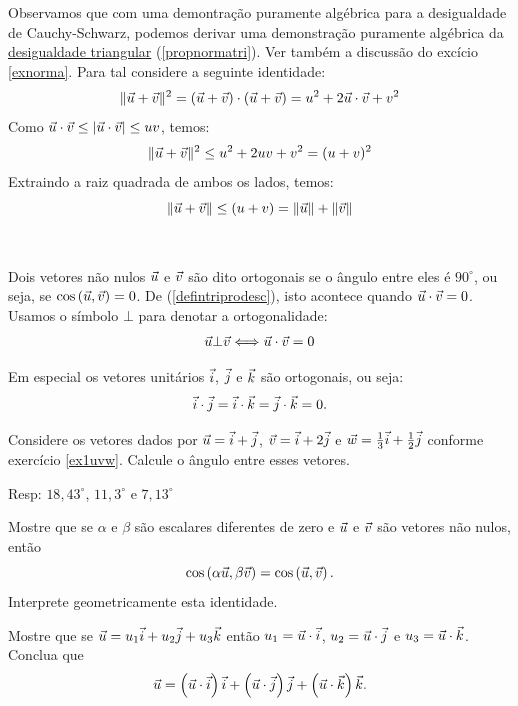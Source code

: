 Observamos que com uma demontração puramente algébrica para a desigualdade de Cauchy-Schwarz, podemos derivar uma demonstração puramente algébrica da \underline{desigualdade triangular} (\ref{propnormatri}). Ver também a discussão do excício \ref{exnorma}. Para tal considere a seguinte identidade:
$$\|\vec{u}+\vec{v}\|^2=\left(\vec{u}+\vec{v}\right)\cdot \left(\vec{u}+\vec{v}\right) = u^2+2\vec{u}\cdot\vec{v}+v^2$$
Como $\vec{u}\cdot\vec{v}\leq |\vec{u}\cdot\vec{v}|\leq uv$, temos:
$$\|\vec{u}+\vec{v}\|^2\leq u^2+2uv+v^2=(u+v)^2$$
Extraindo a raiz quadrada de ambos os lados, temos:
$$\|\vec{u}+\vec{v}\|\leq (u+v)=\|\vec{u}\|+\|\vec{v}\|$$
\\~\\
Dois vetores não nulos $\vec{u}$ e $\vec{v}$ são dito ortogonais se o ângulo entre eles é $90^\circ$, ou seja, se $\cos\left(\vec{u},\vec{v}\right)=0$. De (\ref{defintriprodesc}), isto acontece quando $\vec{u}\cdot\vec{v}=0$. Usamos o símbolo $\bot$ para denotar a ortogonalidade:
\begin{eqnarray}\vec{u}\bot \vec{v}\Longleftrightarrow \vec{u}\cdot\vec{v}=0\label{deforto}
\end{eqnarray}

Em especial os vetores unitários $\vec{i}$, $\vec{j}$ e $\vec{k}$ são ortogonais, ou seja: $$\vec{i}\cdot \vec{j}=\vec{i}\cdot \vec{k}=\vec{j}\cdot \vec{k}=0.$$

\begin{prob} Considere os vetores dados por $\vec{u}=\vec{i}+\vec{j}$, $\vec{v}=\vec{i}+2\vec{j}$ e $\vec{w}=\frac{1}{3}\vec{i}+\frac{1}{2}\vec{j}$ conforme exercício \ref{ex1uvw}. Calcule o ângulo entre esses vetores.  
\end{prob}
Resp: $18,43^\circ$, $11,3^\circ$ e  $7,13^\circ$
\begin{prob} Mostre que se $\alpha$ e $\beta$ são escalares diferentes de zero e $\vec{u}$ e $\vec{v}$ são vetores não nulos, então $$\cos\left(\alpha\vec{u},\beta\vec{v}\right)=\cos\left(\vec{u},\vec{v}\right).$$
Interprete geometricamente esta identidade.
\end{prob}


\begin{prob}Mostre que se $\vec{u}=u_1\vec{i}+u_2\vec{j}+u_3\vec{k}$ então $u_1=\vec{u}\cdot\vec{i}$, $u_2=\vec{u}\cdot\vec{j}$ e $u_3=\vec{u}\cdot\vec{k}$. Conclua que
$$\vec{u}=\left(\vec{u}\cdot\vec{i}\right) \vec{i}+\left(\vec{u}\cdot\vec{j}\right) \vec{j}+\left(\vec{u}\cdot\vec{k}\right) \vec{k}.$$

\end{prob}

